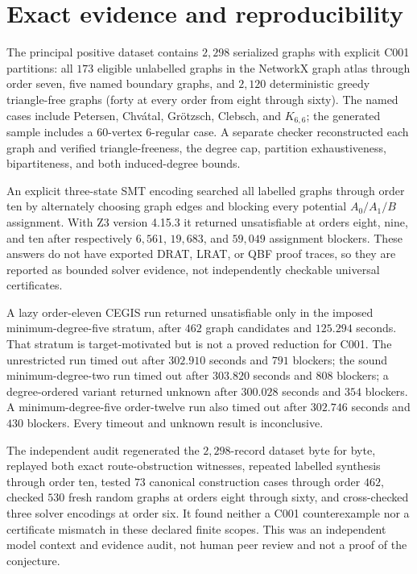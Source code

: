 \documentclass[11pt]{amsart}
\theoremstyle{definition}
\begin{document}
\section{Exact evidence and reproducibility}

The principal positive dataset contains $2{,}298$ serialized graphs with
explicit C001 partitions: all $173$ eligible unlabelled graphs in the
NetworkX graph atlas through order seven, five named boundary graphs, and
$2{,}120$ deterministic greedy triangle-free graphs (forty at every order
from eight through sixty).  The named cases include Petersen, Chv\'atal,
Gr\"otzsch, Clebsch, and $K_{6,6}$; the generated sample includes a
$60$-vertex $6$-regular case.  A separate checker reconstructed each graph
and verified triangle-freeness, the degree cap, partition exhaustiveness,
bipartiteness, and both induced-degree bounds.

An explicit three-state SMT encoding searched all labelled graphs through
order ten by alternately choosing graph edges and blocking every potential
$A_0/A_1/B$ assignment.  With Z3 version 4.15.3 it returned unsatisfiable at
orders eight, nine, and ten after respectively $6{,}561$, $19{,}683$, and
$59{,}049$ assignment blockers.  These answers do not have exported DRAT,
LRAT, or QBF proof traces, so they are reported as bounded solver evidence,
not independently checkable universal certificates.

A lazy order-eleven CEGIS run returned unsatisfiable only in the imposed
minimum-degree-five stratum, after $462$ graph candidates and $125.294$
seconds.  That stratum is target-motivated but is not a proved reduction for
C001.  The unrestricted run timed out after $302.910$ seconds and $791$
blockers; the sound minimum-degree-two run timed out after $303.820$ seconds
and $808$ blockers; a degree-ordered variant returned unknown after $300.028$
seconds and $354$ blockers.  A minimum-degree-five order-twelve run also
timed out after $302.746$ seconds and $430$ blockers.  Every timeout and
unknown result is inconclusive.

The independent audit regenerated the $2{,}298$-record dataset byte for byte,
replayed both exact route-obstruction witnesses, repeated labelled synthesis
through order ten, tested $73$ canonical construction cases through order
$462$, checked $530$ fresh random graphs at orders eight through sixty, and
cross-checked three solver encodings at order six.  It found neither a C001
counterexample nor a certificate mismatch in these declared finite scopes.
This was an independent model context and evidence audit, not human peer
review and not a proof of the conjecture.
\end{document}

